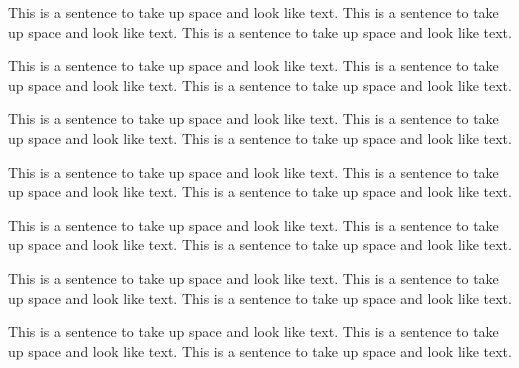 

This is a sentence to take up space and look like text.
This is a sentence to take up space and look like text.
This is a sentence to take up space and look like text.

This is a sentence to take up space and look like text.
This is a sentence to take up space and look like text.
This is a sentence to take up space and look like text.

This is a sentence to take up space and look like text.
This is a sentence to take up space and look like text.
This is a sentence to take up space and look like text.

This is a sentence to take up space and look like text.
This is a sentence to take up space and look like text.
This is a sentence to take up space and look like text.

This is a sentence to take up space and look like text.
This is a sentence to take up space and look like text.
This is a sentence to take up space and look like text.

This is a sentence to take up space and look like text.
This is a sentence to take up space and look like text.
This is a sentence to take up space and look like text.

This is a sentence to take up space and look like text.
This is a sentence to take up space and look like text.
This is a sentence to take up space and look like text.
